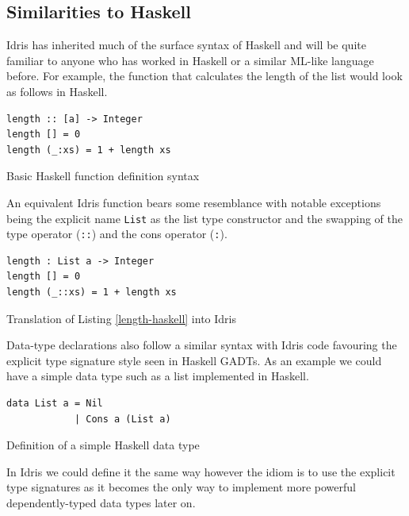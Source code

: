 \documentclass[a4paper, notitlepage]{report}
\begin{document}
\subsection{Similarities to Haskell}
\label{sec:org8673691}
Idris has inherited much of the surface syntax of Haskell and will be quite
familiar to anyone who has worked in Haskell or a similar ML-like language
before. For example, the function that calculates the length of the list would
look as follows in Haskell.

\begin{listing}[H]
\begin{verbatim}
length :: [a] -> Integer
length [] = 0
length (_:xs) = 1 + length xs
\end{verbatim}
\caption{Basic Haskell function definition syntax \label{length-haskell}}
\end{listing}

An equivalent Idris function bears some resemblance with notable exceptions
being the explicit name \texttt{List} as the list type constructor and the swapping of
the type operator (\texttt{::}) and the cons operator (\texttt{:}).

\begin{listing}[H]
\begin{verbatim}
length : List a -> Integer
length [] = 0
length (_::xs) = 1 + length xs
\end{verbatim}
\caption{Translation of Listing \ref{length-haskell} into Idris}
\end{listing}

Data-type declarations also follow a similar syntax with Idris code favouring
the explicit type signature style seen in Haskell GADTs. As an example we could
have a simple data type such as a list implemented in Haskell.

\begin{listing}[H]
\begin{verbatim}
data List a = Nil
            | Cons a (List a)
\end{verbatim}
\caption{Definition of a simple Haskell data type \label{list-haskell}}
\end{listing}

In Idris we could define it the same way however the idiom is to use the
explicit type signatures as it becomes the only way to implement more powerful
dependently-typed data types later on.
\end{document}
